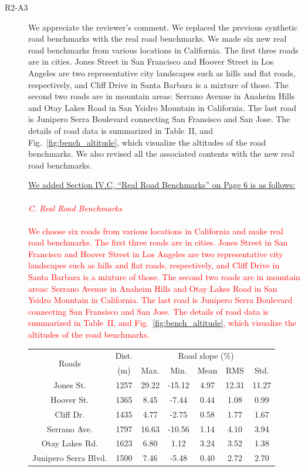 \documentclass[onecolumn]{IEEEconf}
\begin{document}
\begin{description}
\item [R2-A3] We appreciate the reviewer's comment. We replaced the previous synthetic road benchmarks with the real road benchmarks. We made six new real road benchmarks from various locations in California.  The first three roads are in cities. Jones Street in San Francisco and Hoover Street in Los Angeles are two representative city landscapes such as hills and flat roads, respectively, and Cliff Drive in Santa Barbara is a mixture of those. The second two roads are in mountain areas: Serrano Avenue in Anaheim Hills and Otay Lakes Road in San Ysidro Mountain in California. The last road is Junipero Serra Boulevard connecting San Fransisco and San Jose. The details of road data is summarized in Table~II, and Fig.~\ref{fig:bench_altitude}, which visualize the altitudes of the road benchmarks. We also revised all the associated contents with the new real road benchmarks. 

\uline{We added Section IV.C, ``Real Road Benchmarks'' on Page 6 is as follows:}\\ \\
\textcolor{red}{\it C. Real Road Benchmarks}\\ \\
\textcolor{red}{We choose six  roads from various locations in California and make real road benchmarks. The first three roads are in cities. Jones Street in San Francisco and Hoover Street in Los Angeles are two representative city landscapes such as hills and flat roads, respectively, and Cliff Drive in Santa Barbara is a mixture of those. The second two roads are in mountain areas: Serrano Avenue in Anaheim Hills and Otay Lakes Road in San Ysidro Mountain in California. The last road is Junipero Serra Boulevard connecting San Fransisco and San Jose. The details of road data is summarized in Table~II, and Fig.~\ref{fig:bench_altitude}, which visualize the altitudes of the road benchmarks.}



\begin{table} [h!]
\centering
\label{table:road_bench}
\begin{tabular}{|c|c|c|c|c|c|c|}  \hline
\multirow{2}{*}{Roads} 
				&Dist.		&\multicolumn{5}{|c|}{Road slope (\%)}  \\ \cline{3-7}
				&(m)		 	&Max.		&Min. 	&Mean		&RMS 	&Std.	\\ \hline
Jones St. 	&1257		&29.22		&-15.12	&4.97 		&12.31 	&11.27	\\ \hline
Hoover St. 	&1365		&8.45		&-7.44	&0.44		&1.08 	&0.99	\\ \hline
Cliff Dr. 	&1435		&4.77		&-2.75	&0.58		&1.77 	&1.67	\\ \hline
Serrano Ave.		&1797		&16.63		&-10.56	&1.14 		&4.10 	&3.94	\\ \hline
Otay Lakes Rd.		&1623		&6.80		&1.12	&3.24		&3.52 	&1.38	\\ \hline
Junipero Serra Blvd.	&1500		&7.46		&-5.48	&0.40		&2.72 	&2.70	\\ \hline
\end{tabular}
\end{table}



\end{description}
\end{document}
